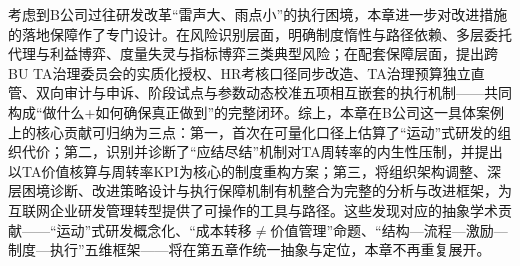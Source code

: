 考虑到B公司过往研发改革“雷声大、雨点小”的执行困境，本章进一步对改进措施的落地保障作了专门设计。在风险识别层面，明确制度惰性与路径依赖、多层委托代理与利益博弈、度量失灵与指标博弈三类典型风险；在配套保障层面，提出跨BU TA治理委员会的实质化授权、HR考核口径同步改造、TA治理预算独立直管、双向审计与申诉、阶段试点与参数动态校准五项相互嵌套的执行机制——共同构成“做什么+如何确保真正做到”的完整闭环。综上，本章在B公司这一具体案例上的核心贡献可归纳为三点：第一，首次在可量化口径上估算了“运动”式研发的组织代价；第二，识别并诊断了“应结尽结”机制对TA周转率的内生性压制，并提出以TA价值核算与周转率KPI为核心的制度重构方案；第三，将组织架构调整、深层困境诊断、改进策略设计与执行保障机制有机整合为完整的分析与改进框架，为互联网企业研发管理转型提供了可操作的工具与路径。这些发现对应的抽象学术贡献——“运动”式研发概念化、“成本转移$\neq$价值管理”命题、“结构—流程—激励—制度—执行”五维框架——将在第五章作统一抽象与定位，本章不再重复展开。
